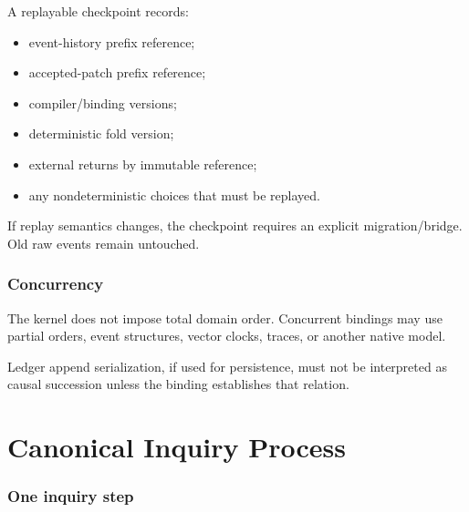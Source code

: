\documentclass[11pt,oneside]{article}
\begin{document}
A replayable checkpoint records:
\begin{itemize}
\item event-history prefix reference;
\item accepted-patch prefix reference;
\item compiler/binding versions;
\item deterministic fold version;
\item external returns by immutable reference;
\item any nondeterministic choices that must be replayed.
\end{itemize}

If replay semantics changes, the checkpoint requires an explicit migration/bridge.  Old raw events remain untouched.

\section{Concurrency}

The kernel does not impose total domain order.  Concurrent bindings may use partial orders, event structures, vector clocks, traces, or another native model.

Ledger append serialization, if used for persistence, must not be interpreted as causal succession unless the binding establishes that relation.

\part{Canonical Inquiry Process}

\section{One inquiry step}
\end{document}

